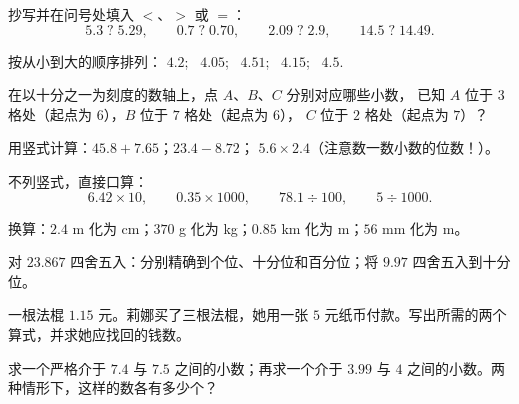 \begin{exercise}[$\star$]\label{exo:g6:decimals:3}
抄写并在问号处填入 $<$、$>$ 或 $=$：
\[
5.3 \;?\; 5.29, \qquad
0.7 \;?\; 0.70, \qquad
2.09 \;?\; 2.9, \qquad
14.5 \;?\; 14.49 .
\]
\end{exercise}

\begin{exercise}[$\star$]\label{exo:g6:decimals:4}
按从小到大的顺序排列：
$4.2$; \ $4.05$; \ $4.51$; \ $4.15$; \ $4.5$.
\end{exercise}

\begin{exercise}[$\star$]\label{exo:g6:decimals:5}
在以十分之一为刻度的数轴上，点 $A$、$B$、$C$ 分别对应哪些小数，
已知 $A$ 位于 $3$ 格处（起点为 $6$），$B$ 位于 $7$ 格处（起点为 $6$），
$C$ 位于 $2$ 格处（起点为 $7$）？
\end{exercise}

\begin{exercise}[$\star$]\label{exo:g6:decimals:6}
用竖式计算：$45.8 + 7.65$；\quad $23.4 - 8.72$；\quad
$5.6 \times 2.4$（注意数一数小数的位数！）。
\end{exercise}

\begin{exercise}[$\star$]\label{exo:g6:decimals:7}
不列竖式，直接口算：
\[
6.42 \times 10, \qquad
0.35 \times 1000, \qquad
78.1 \div 100, \qquad
5 \div 1000 .
\]
\end{exercise}

\begin{exercise}[$\star$]\label{exo:g6:decimals:8}
换算：$2.4$ m 化为 cm；\quad $370$ g 化为 kg；\quad $0.85$ km 化为
m；\quad $56$ mm 化为 m。
\end{exercise}

\begin{exercise}[$\star$]\label{exo:g6:decimals:9}
对 $23.867$ 四舍五入：分别精确到个位、十分位和百分位；将
$9.97$ 四舍五入到十分位。
\end{exercise}

\begin{exercise}[$\star\star$]\label{exo:g6:decimals:10}
一根法棍 $1.15$ 元。莉娜买了三根法棍，她用一张
$5$ 元纸币付款。写出所需的两个算式，并求她应找回的钱数。
\end{exercise}

\begin{exercise}[$\star\star$]\label{exo:g6:decimals:11}
求一个严格介于 $7.4$ 与 $7.5$ 之间的小数；再求一个介于
$3.99$ 与 $4$ 之间的小数。两种情形下，这样的数各有多少个？
\end{exercise}


